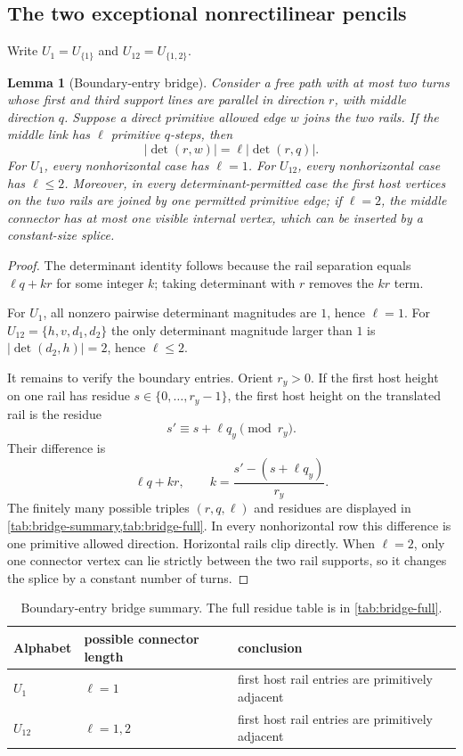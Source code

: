 \documentclass[11pt]{article}
\newtheorem{lemma}[theorem]{Lemma}
\theoremstyle{definition}
\begin{document}
\subsection{The two exceptional nonrectilinear pencils}
Write $U_1=U_{\{1\}}$ and $U_{12}=U_{\{1,2\}}$.

\begin{lemma}[Boundary-entry bridge]\label{lem:bridge}
Consider a free path with at most two turns whose first and third support lines are parallel in direction $r$, with middle direction $q$.  Suppose a direct primitive allowed edge $w$ joins the two rails.  If the middle link has $\ell$ primitive $q$-steps, then
\[
|\det(r,w)|=\ell|\det(r,q)|.
\]
For $U_1$, every nonhorizontal case has $\ell=1$.  For $U_{12}$, every nonhorizontal case has $\ell\le2$.  Moreover, in every determinant-permitted case the first host vertices on the two rails are joined by one permitted primitive edge; if $\ell=2$, the middle connector has at most one visible internal vertex, which can be inserted by a constant-size splice.
\end{lemma}
\begin{proof}
The determinant identity follows because the rail separation equals $\ell q+kr$ for some integer $k$; taking determinant with $r$ removes the $kr$ term.

For $U_1$, all nonzero pairwise determinant magnitudes are $1$, hence $\ell=1$.  For $U_{12}=\{h,v,d_1,d_2\}$ the only determinant magnitude larger than $1$ is $|\det(d_2,h)|=2$, hence $\ell\le2$.

It remains to verify the boundary entries.  Orient $r_y>0$.  If the first host height on one rail has residue $s\in\{0,\ldots,r_y-1\}$, the first host height on the translated rail is the residue
\[
s'\equiv s+\ell q_y\pmod{r_y}.
\]
Their difference is
\[
\ell q+kr,
\qquad k=\frac{s'-(s+\ell q_y)}{r_y}.
\]
The finitely many possible triples $(r,q,\ell)$ and residues are displayed in \cref{tab:bridge-summary,tab:bridge-full}.  In every nonhorizontal row this difference is one primitive allowed direction.  Horizontal rails clip directly.  When $\ell=2$, only one connector vertex can lie strictly between the two rail supports, so it changes the splice by a constant number of turns.
\end{proof}

\begin{table}[t]
\centering
\caption{Boundary-entry bridge summary.  The full residue table is in \cref{tab:bridge-full}.}
\label{tab:bridge-summary}
\begin{tabular}{lll}
\toprule
Alphabet & possible connector length & conclusion\\
\midrule
$U_1$ & $\ell=1$ & first host rail entries are primitively adjacent\\
$U_{12}$ & $\ell=1,2$ & first host rail entries are primitively adjacent\\
\bottomrule
\end{tabular}
\end{table}
\end{document}
